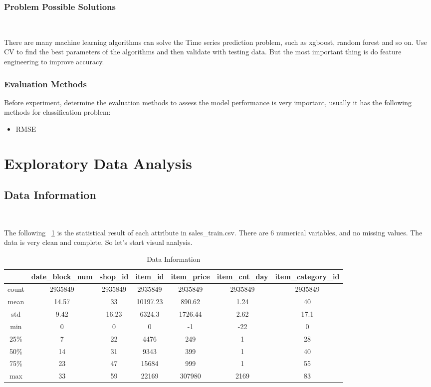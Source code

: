 \subsubsection{Problem Possible Solutions}
\

There are many machine learning algorithms 
can solve the Time series prediction problem,
such as xgboost,
random forest and so on.
Use CV to find the best parameters of the algorithms 
and then validate with testing data.
But the most important thing is 
do  feature engineering to improve accuracy. 


\subsubsection{Evaluation Methods}


Before experiment, determine the evaluation methods
to assess the model performance is very important,
usually it has the following methods
for classification problem:

\begin{itemize}
	\item RMSE
\end{itemize} 


\section{Exploratory Data Analysis} \label{sec-data_exploration}

\subsection{Data Information}
\

The following  ~\cref{tbl:data information}
is the statistical result of each attribute in sales\_train.csv.
There are 6 numerical variables,
and no missing values.
The data is very clean and complete, So let's start visual analysis.



\begin{table}[htbp]  \centering
	\caption{Data Information}
	\label{tbl:data information}
	\begin{tabular}{ccccccc}
		\hline
		& date\_block\_num & shop\_id & item\_id & item\_price & item\_cnt\_day 
		& item\_category\_id\\
		\hline
		count & 2935849 & 2935849 & 2935849 & 2935849 & 2935849 & 2935849 \\
		mean & 14.57 & 33 & 10197.23 & 890.62 & 1.24 & 40 \\
		std & 9.42 & 16.23 & 6324.3 & 1726.44 & 2.62 & 17.1 \\
		min & 0 & 0 & 0 & -1 & -22 & 0 \\
		25\%  & 7 & 22 & 4476 & 249 & 1 & 28 \\
		50\%  & 14 & 31 & 9343 & 399 & 1 & 40\\
		75\% & 23 & 47 & 15684 & 999 & 1 & 55\\
		max & 33 & 59 & 22169 & 307980 & 2169 & 83\\
		\hline 
	\end{tabular}
\end{table}

